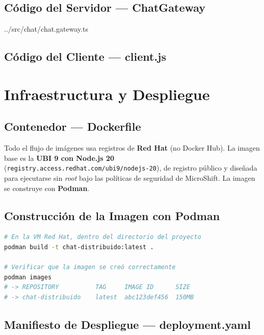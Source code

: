 \documentclass[11pt,a4paper]{article}
\begin{document}
\subsection{Código del Servidor --- ChatGateway}

  {../src/chat/chat.gateway.ts}

\subsection{Código del Cliente --- client.js}


\newpage
\section{Infraestructura y Despliegue}

\subsection{Contenedor --- Dockerfile}
Todo el flujo de imágenes usa registros de \textbf{Red Hat} (no Docker Hub). La
imagen base es la \textbf{UBI 9 con Node.js 20}
(\texttt{registry.access.redhat.com/ubi9/nodejs-20}), de registro público y
diseñada para ejecutarse sin \emph{root} bajo las políticas de seguridad de
MicroShift. La imagen se construye con \textbf{Podman}.


\subsection{Construcción de la Imagen con Podman}
\begin{lstlisting}[language=bash]
# En la VM Red Hat, dentro del directorio del proyecto
podman build -t chat-distribuido:latest .

# Verificar que la imagen se creó correctamente
podman images
# -> REPOSITORY          TAG     IMAGE ID      SIZE
# -> chat-distribuido    latest  abc123def456  150MB
\end{lstlisting}

\subsection{Manifiesto de Despliegue --- deployment.yaml}

\end{document}
